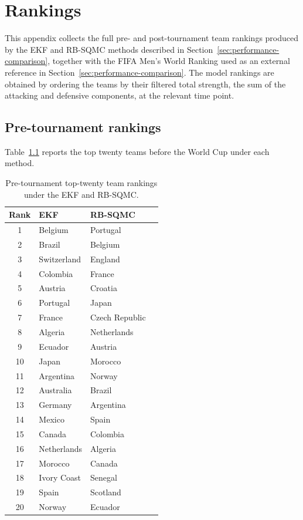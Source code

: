 \chapter{Rankings}
\label{app:rankings}

This appendix collects the full pre- and post-tournament team rankings produced by the EKF and RB-SQMC methods described in Section~\ref{sec:performance-comparison}, together with the FIFA Men's World Ranking \citep{fifaworldranking2026} used as an external reference in Section~\ref{sec:performance-comparison}. The model rankings are obtained by ordering the teams by their filtered total strength, the sum of the attacking and defensive components, at the relevant time point.

\section{Pre-tournament rankings}

Table~\ref{tab:rankings-pre} reports the top twenty teams before the World Cup under each method.

\begin{table}[H]
\centering
\begin{tabular}{clll}
\toprule
Rank & EKF & RB-SQMC \\
\midrule
1 & Belgium & Portugal \\
2 & Brazil & Belgium \\
3 & Switzerland & England \\
4 & Colombia & France \\
5 & Austria & Croatia \\
6 & Portugal & Japan \\
7 & France & Czech Republic \\
8 & Algeria & Netherlands \\
9 & Ecuador & Austria \\
10 & Japan & Morocco \\
11 & Argentina & Norway \\
12 & Australia & Brazil \\
13 & Germany & Argentina \\
14 & Mexico & Spain \\
15 & Canada & Colombia \\
16 & Netherlands & Algeria \\
17 & Morocco & Canada \\
18 & Ivory Coast & Senegal \\
19 & Spain & Scotland \\
20 & Norway & Ecuador \\
\bottomrule
\end{tabular}
\caption{Pre-tournament top-twenty team rankings under the EKF and RB-SQMC.}
\label{tab:rankings-pre}
\end{table}


